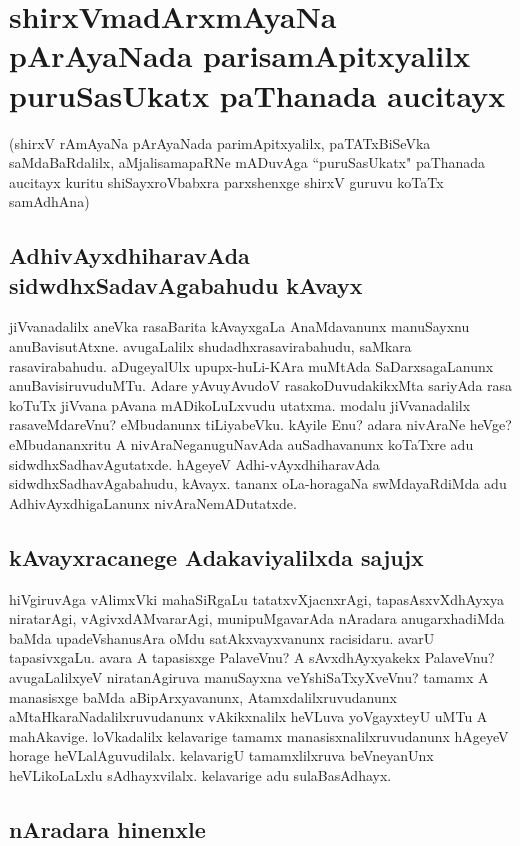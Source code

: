 \chapter{shirxVmadArxmAyaNa pArAyaNada parisamApitxyalilx puruSasUkatx paThanada aucitayx}

(shirxV rAmAyaNa pArAyaNada parimApitxyalilx, paTATxBiSeVka saMdaBaRdalilx, aMjalisamapaRNe mADuvAga ``puruSasUkatx" paThanada aucitayx kuritu shiSayxroVbabxra parxshenxge shirxV guruvu koTaTx samAdhAna)

\section*{AdhivAyxdhiharavAda sidwdhxSadavAgabahudu kAvayx}

jiVvanadalilx aneVka rasaBarita kAvayxgaLa AnaMdavanunx manuSayxnu anuBavisutAtxne. avugaLalilx shudadhxrasavirabahudu, saMkara rasavirabahudu. aDugeyalUlx upupx-huLi-KAra muMtAda SaDarxsagaLanunx anuBavisiruvuduMTu. Adare yAvuyAvudoV rasakoDuvudakikxMta sariyAda rasa koTuTx jiVvana pAvana mADikoLuLxvudu utatxma. modalu jiVvanadalilx rasaveMdareVnu? eMbudanunx tiLiyabeVku. kAyile Enu? adara nivAraNe heVge? eMbudananxritu A nivAraNeganuguNavAda auSadhavanunx koTaTxre adu sidwdhxSadhavAgutatxde. hAgeyeV Adhi-vAyxdhiharavAda sidwdhxSadhavAgabahudu, kAvayx. tananx oLa-horagaNa swMdayaRdiMda adu AdhivAyxdhigaLanunx nivAraNemADutatxde. 

\section*{kAvayxracanege Adakaviyalilxda sajujx}

hiVgiruvAga vAlimxVki mahaSiRgaLu tatatxvXjacnxrAgi, tapasAsxvXdhAyxya niratarAgi, vAgivxdAMvararAgi, munipuMgavarAda nAradara anugarxhadiMda baMda upadeVshanusAra oMdu satAkxvayxvanunx racisidaru. avarU tapasivxgaLu. avara A tapasisxge PalaveVnu? A sAvxdhAyxyakekx PalaveVnu? avugaLalilxyeV niratanAgiruva manuSayxna veYshiSaTxyXveVnu? tamamx A manasisxge baMda aBipArxyavanunx, Atamxdalilxruvudanunx aMtaHkaraNadalilxruvudanunx vAkikxnalilx heVLuva yoVgayxteyU uMTu A mahAkavige. loVkadalilx kelavarige tamamx manasisxnalilxruvudanunx hAgeyeV horage heVLalAguvudilalx. kelavarigU tamamxlilxruva beVneyanUnx heVLikoLaLxlu sAdhayxvilalx. kelavarige adu sulaBasAdhayx.

\section*{nAradara hinenxle}

